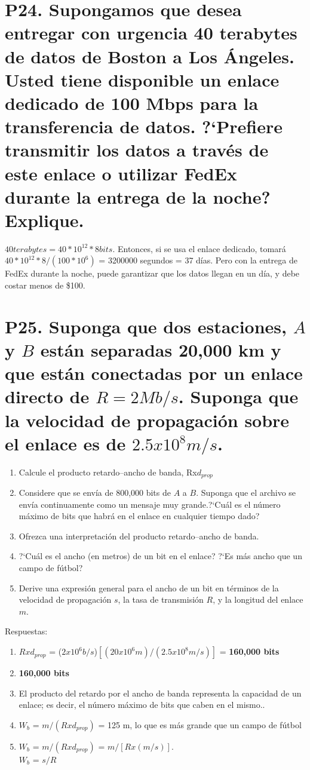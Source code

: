 \documentclass[a4paper, 11pt]{article}
\theoremstyle{definition} \theoremstyle{remark}
\begin{document}
     \section{P24. Supongamos que desea entregar con urgencia 40 terabytes de datos de Boston a Los \'Angeles. Usted tiene disponible un enlace dedicado de 100 Mbps para la transferencia de datos. ?`Prefiere transmitir los datos a trav\'es de este enlace o utilizar FedEx durante la entrega de la noche? Explique.}
     $40 terabytes = 40 * 10^{12} * 8 bits$. Entonces, si se usa el enlace dedicado, tomar\'a $40 * 10^12 * 8 / (100 *10^6 )$ = 3200000 segundos = 37 d\'ias. Pero con la entrega de FedEx durante la noche, puede garantizar que los datos llegan en un d\'ia, y debe costar menos de \$100.

     \section{P25. Suponga que dos estaciones, $A$ y $B$ est\'an separadas 20,000 km y que est\'an conectadas por un enlace directo de $R = 2 {Mb/s}$. Suponga que la velocidad de propagaci\'on sobre el enlace es de $2.5x10^8 m/s$.}
     \renewcommand{\theenumi}{\Alph{enumi}}
     \begin{enumerate}
       \item Calcule el producto retardo--ancho de banda, Rx$d_{prop}$
       \item Considere que se env\'ia de 800,000 bits de $A$ a $B$. Suponga que el archivo se env\'ia continuamente como un mensaje muy grande.?`Cu\'al es el n\'umero m\'aximo de bits que habr\'a en el enlace en cualquier tiempo dado?
       \item Ofrezca una interpretaci\'on del producto retardo--ancho de banda.
       \item ?`Cu\'al es el ancho (en metros) de un bit en el enlace? ?`Es m\'as ancho que un campo de f\'utbol?
       \item Derive una expresi\'on general para el ancho de un bit en t\'erminos de la velocidad de propagaci\'on $s$, la tasa de transmisi\'on $R$, y la longitud del enlace $m$.
     \end{enumerate}
     Respuestas:
     \renewcommand{\theenumi}{\Alph{enumi}}
     \begin{enumerate}
       \item  $Rxd_{prop}$ = ($2x10^6b/s$)$[(20x10^6m)/(2.5x10^8m/s)]$ = \textbf{160,000 bits}
       \item \textbf{160,000 bits}
       \item El producto del retardo por el ancho de banda representa la capacidad de un enlace; es decir, el n\'umero m\'aximo de bits que caben en el mismo..
       \item $W_{b}$ = $m/(Rxd_{prop})$ = 125 m, lo que es m\'as grande que un campo de f\'utbol
       \item $W_{b}$ = $m/(Rxd_{prop})$ = $m/[Rx(m/s)]$.\\
            $W_{b}$ = $s/R$
     \end{enumerate}
\end{document}
